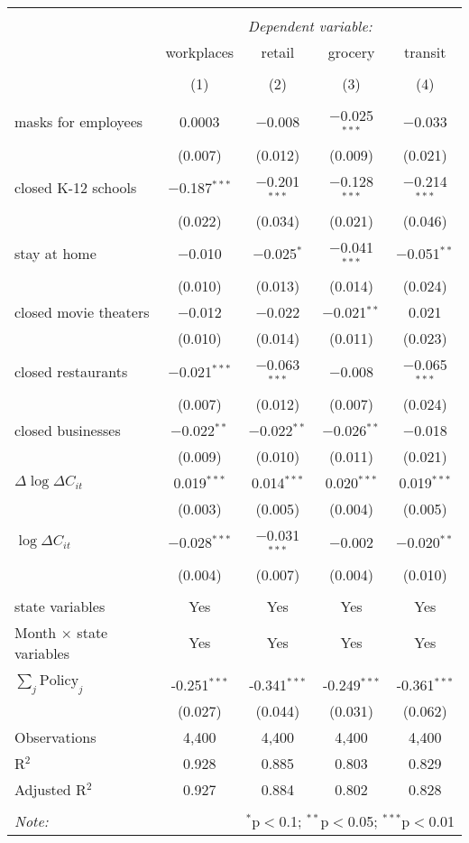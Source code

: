\begin{tabular}{@{\extracolsep{1pt}}lcccc} 
\\[-1.8ex]\hline 
\hline \\[-1.8ex] 
 & \multicolumn{4}{c}{\textit{Dependent variable:}} \\ 
\cline{2-5} 
 & workplaces & retail & grocery & transit \\ 
\\[-1.8ex] & (1) & (2) & (3) & (4)\\ 
\hline \\[-1.8ex] 
 masks for employees & 0.0003 & $-$0.008 & $-$0.025$^{***}$ & $-$0.033 \\ 
  & (0.007) & (0.012) & (0.009) & (0.021) \\ 
  closed K-12 schools & $-$0.187$^{***}$ & $-$0.201$^{***}$ & $-$0.128$^{***}$ & $-$0.214$^{***}$ \\ 
  & (0.022) & (0.034) & (0.021) & (0.046) \\ 
  stay at home & $-$0.010 & $-$0.025$^{*}$ & $-$0.041$^{***}$ & $-$0.051$^{**}$ \\ 
  & (0.010) & (0.013) & (0.014) & (0.024) \\ 
  closed movie theaters & $-$0.012 & $-$0.022 & $-$0.021$^{**}$ & 0.021 \\ 
  & (0.010) & (0.014) & (0.011) & (0.023) \\ 
  closed restaurants & $-$0.021$^{***}$ & $-$0.063$^{***}$ & $-$0.008 & $-$0.065$^{***}$ \\ 
  & (0.007) & (0.012) & (0.007) & (0.024) \\ 
  closed businesses & $-$0.022$^{**}$ & $-$0.022$^{**}$ & $-$0.026$^{**}$ & $-$0.018 \\ 
  & (0.009) & (0.010) & (0.011) & (0.021) \\ 
  $\Delta \log \Delta C_{it}$ & 0.019$^{***}$ & 0.014$^{***}$ & 0.020$^{***}$ & 0.019$^{***}$ \\ 
  & (0.003) & (0.005) & (0.004) & (0.005) \\ 
  $\log \Delta C_{it}$ & $-$0.028$^{***}$ & $-$0.031$^{***}$ & $-$0.002 & $-$0.020$^{**}$ \\ 
  & (0.004) & (0.007) & (0.004) & (0.010) \\ 
 \hline \\[-1.8ex] 
state variables & Yes & Yes & Yes & Yes \\ 
Month $\times$ state variables & Yes & Yes & Yes & Yes \\ 
\hline \\[-1.8ex] 
$\sum_j \mathrm{Policy}_j$ & -0.251$^{***}$ & -0.341$^{***}$ & -0.249$^{***}$ & -0.361$^{***}$ \\ 
 & (0.027) & (0.044) & (0.031) & (0.062) \\ 
Observations & 4,400 & 4,400 & 4,400 & 4,400 \\ 
R$^{2}$ & 0.928 & 0.885 & 0.803 & 0.829 \\ 
Adjusted R$^{2}$ & 0.927 & 0.884 & 0.802 & 0.828 \\ 
\hline 
\hline \\[-1.8ex] 
\textit{Note:}  & \multicolumn{4}{r}{$^{*}$p$<$0.1; $^{**}$p$<$0.05; $^{***}$p$<$0.01} \\ 
\end{tabular} 